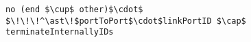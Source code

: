 \lstset{frame=tb, aboveskip=12pt, belowskip=-3pt, breaklines=true, basicstyle=\small\ttfamily, tabsize=2, mathescape=true}
\begin{lstlisting}[caption={port\_inference.als, lines 249-249}, label=alloy:PI_BROKEN_LINKS, captionpos=b]
no (end $\cup$ other)$\cdot$ $\!\!\!^\ast\!$portToPort$\cdot$linkPortID $\cap$ terminateInternallyIDs
\end{lstlisting}